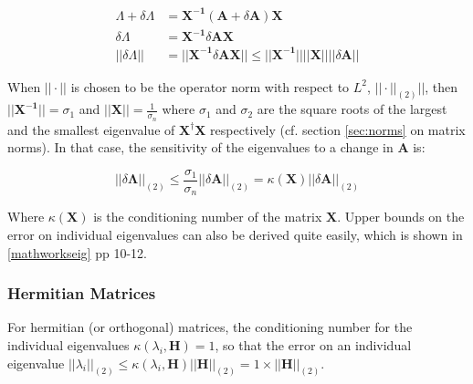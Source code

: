 \begin{equation}
\begin{array}{rl}
\Lambda + \delta\Lambda &= \mathbf{X^{-1}}\left( \mathbf{A} + \delta\mathbf{A} \right)\mathbf{X} \\
\delta\Lambda &= \mathbf{X^{-1}} \delta \mathbf{A} \mathbf{X}\\
||\delta\Lambda || &= ||\mathbf{X^{-1}} \delta \mathbf{A} \mathbf{X} || \leq  ||\mathbf{X^{-1}}|| ||\mathbf{X}|| ||\delta\mathbf{A}||
\end{array}
\end{equation}

When $||\cdot||$ is chosen to be the operator norm with respect to $L^2$, $||\cdot||_{(2)}||$, then $||\mathbf{X^{-1}}|| = \sigma_1$ and $||\mathbf{X}|| = \frac{1}{\sigma_n}$ where $\sigma_1$ and $\sigma_2$ are the square roots of the largest and the smallest eigenvalue of $\mathbf{X^{\dagger}}\mathbf{X}$ respectively (cf. section \ref{sec:norms} on matrix norms). In that case, the sensitivity of the eigenvalues to a change in $\mathbf{A}$ is:

\begin{equation}
||\delta\mathbf{\Lambda}||_{(2)} \leq \frac{\sigma_1}{\sigma_n} ||\delta\mathbf{A}||_{(2)} = \kappa(\mathbf{X})||\delta\mathbf{A}||_{(2)}
\end{equation}

Where $\kappa(\mathbf{X})$ is the conditioning number of the matrix $\mathbf{X}$. Upper bounds on the error on individual eigenvalues can also be derived quite easily, which is shown in \ref{mathworkseig} pp 10-12.

\subsubsection{Hermitian Matrices}
For hermitian (or orthogonal) matrices, the conditioning number for the individual eigenvalues  $\kappa(\lambda_i,\mathbf{H}) = 1$, so that the error on an individual eigenvalue $||\lambda_i||_{(2)} \leq \kappa(\lambda_i,\mathbf{H}) ||\mathbf{H}||_{(2)} = 1\times ||\mathbf{H}||_{(2)}$. 